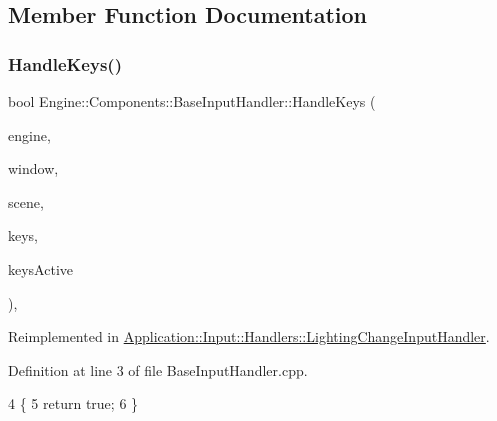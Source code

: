 \subsection{Member Function Documentation}
\mbox{\label{classEngine_1_1Components_1_1BaseInputHandler_af7deea3367074324fdbefe48119d40ce}} 
\subsubsection{\texorpdfstring{Handle\+Keys()}{HandleKeys()}}
{\footnotesize\ttfamily bool Engine\+::\+Components\+::\+Base\+Input\+Handler\+::\+Handle\+Keys (\begin{DoxyParamCaption}\item[{\mbox{\hyperlink{classEngine_1_1BaseEngine}{Base\+Engine}} $\ast$}]{engine,  }\item[{\mbox{\hyperlink{classEngine_1_1Components_1_1Window}{Window}} $\ast$}]{window,  }\item[{\mbox{\hyperlink{classEngine_1_1Components_1_1Scene}{Scene}} $\ast$}]{scene,  }\item[{\mbox{\hyperlink{classGeneric_1_1Dictionary}{Generic\+::\+Dictionary}}$<$ short, bool $>$ \&}]{keys,  }\item[{int}]{keys\+Active }\end{DoxyParamCaption})\hspace{0.3cm}{\ttfamily [override]}, {\ttfamily [virtual]}}



Reimplemented in \mbox{\hyperlink{classApplication_1_1Input_1_1Handlers_1_1LightingChangeInputHandler_a5017479d6edea9d6bedf3093cf49cb24}{Application\+::\+Input\+::\+Handlers\+::\+Lighting\+Change\+Input\+Handler}}.



Definition at line 3 of file Base\+Input\+Handler.\+cpp.


\begin{DoxyCode}
4 \{
5     \textcolor{keywordflow}{return} \textcolor{keyword}{true};
6 \}
\end{DoxyCode}
\mbox{\label{classEngine_1_1Components_1_1BaseInputHandler_a8b50fb66d01573616072d708075a721e}} 
